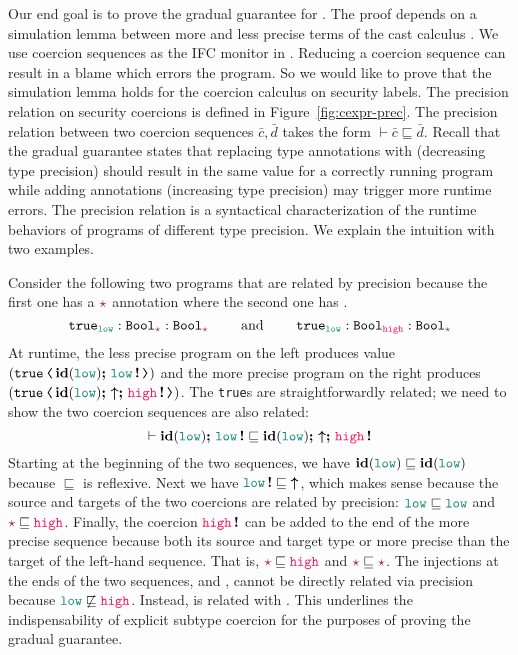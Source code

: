 Our end goal is to prove the gradual guarantee for \Surface.
The proof depends on a simulation lemma between more and less precise terms of
the cast calculus \CC . We use coercion sequences as the IFC monitor in \CC.
Reducing a coercion sequence can result in a blame which errors the program. So
we would like to prove that the simulation lemma holds for the coercion calculus
on security labels.
%
The precision relation on security coercions is defined in
Figure~\ref{fig:cexpr-prec}. The precision relation between two coercion
sequences $\bar{c},\bar{d}$ takes the form $\vdash \bar{c} \sqsubseteq \bar{d}$.
Recall that the gradual guarantee states that replacing type annotations with
\unk (decreasing type precision) should result in the same value for a correctly
running program while adding annotations (increasing type precision) may trigger
more runtime errors. The precision relation is a syntactical characterization of
the runtime behaviors of programs of different type precision. We explain the
intuition with two examples.

\begin{example}
\label{ex:prec}
\normalfont

Consider the following two programs that are related by precision
because the first one has a $\unk$ annotation where the second one
has \high.
\[
\true_{\low} : \Bool_{\unk} : \Bool_{\unk} \qquad\text{ and }\qquad
\true_{\low} : \Bool_{\high} : \Bool_{\unk}
\]
At runtime, the less precise program on the left produces value
$(\cccast{\true}{\id{\low} \seq \inj{\low}})$ and the more precise program
on the right produces $(\cccast{\true}{\id{\low} \seq \up \seq \inj{\high}})$.
The \texttt{true}s are straightforwardly related; we need to show the two
coercion sequences are also related:
\[
\vdash \id{\low} \seq \inj{\low} \sqsubseteq \id{\low} \seq \up \seq \inj{\high}
\]
Starting at the beginning of the
two sequences, we have $\id{\low} \sqsubseteq \id{\low}$ because
$\sqsubseteq$ is reflexive. Next we have
$\inj{\low} \sqsubseteq \;\up$, which makes sense because the source
and targets of the two coercions are related by precision:
$\low \sqsubseteq \low$ and $\unk \sqsubseteq \high$.  Finally, the
coercion $\inj{\high}$ can be added to the end of the more precise
sequence because both its source and target type or more precise than
the target of the left-hand sequence.  That is,
$\unk \sqsubseteq \high$ and $\unk \sqsubseteq \unk$.
%
The injections at the ends of the two sequences, \inj{\low}
and \inj{\high}, cannot be directly related via precision because
$\low \not\sqsubseteq \high$.  Instead, \inj{\low} is related
with \up{}. This underlines the indispensability of explicit subtype
coercion \up{} for the purposes of proving the gradual guarantee.

\end{example}

